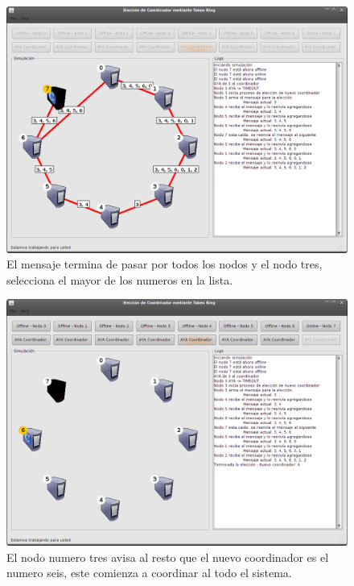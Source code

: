 \begin{figure}
\centering
 \includegraphics[scale=0.4,keepaspectratio=true]{./imagenes/tokenRing/token5.png}
 \caption{El mensaje termina de pasar por todos los nodos y el nodo tres, selecciona el mayor de los numeros en la lista.}
\end{figure}

\begin{figure}
\centering
 \includegraphics[scale=0.4,keepaspectratio=true]{./imagenes/tokenRing/token6.png}
 \caption{El nodo numero tres avisa al resto que el nuevo coordinador es el numero seis, este comienza a coordinar al todo el sistema.}
\end{figure}

